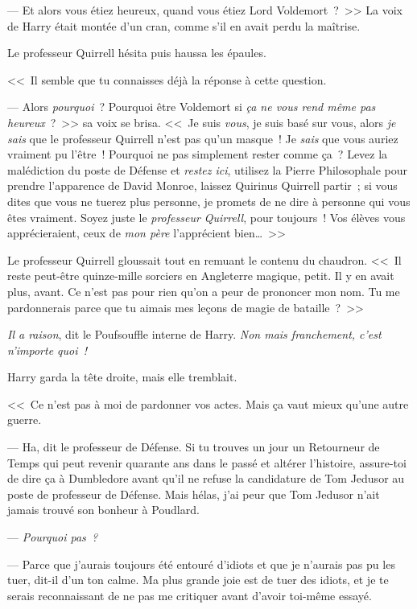 --- Et alors vous étiez heureux, quand vous étiez Lord Voldemort~?~>> La voix de Harry était montée d'un cran, comme s'il en avait perdu la maîtrise.

Le professeur Quirrell hésita puis haussa les épaules.

<<~Il semble que tu connaisses déjà la réponse à cette question.

--- Alors \emph{pourquoi}~? Pourquoi être Voldemort si \emph{ça ne vous rend même pas heureux}~?~>> sa voix se brisa. <<~Je suis \emph{vous}, je suis basé sur vous, alors \emph{je sais} que le professeur Quirrell n'est pas qu'un masque~! Je \emph{sais} que vous auriez vraiment pu l'être~! Pourquoi ne pas simplement rester comme ça~? Levez la malédiction du poste de Défense et \emph{restez ici}, utilisez la Pierre Philosophale pour prendre l'apparence de David Monroe, laissez Quirinus Quirrell partir~; si vous dites que vous ne tuerez plus personne, je promets de ne dire à personne qui vous êtes vraiment. Soyez juste le \emph{professeur Quirrell}, pour toujours~! Vos élèves vous apprécieraient, ceux de \emph{mon père} l'apprécient bien…~>>

Le professeur Quirrell gloussait tout en remuant le contenu du chaudron. <<~Il reste peut-être quinze-mille sorciers en Angleterre magique, petit. Il y en avait plus, avant. Ce n'est pas pour rien qu'on a peur de prononcer mon nom. Tu me pardonnerais parce que tu aimais mes leçons de magie de bataille~?~>>

\emph{Il a raison}, dit le Poufsouffle interne de Harry. \emph{Non mais franchement, c'est n'importe quoi~!}

Harry garda la tête droite, mais elle tremblait.

<<~Ce n'est pas à moi de pardonner vos actes. Mais ça vaut mieux qu'une autre guerre.

--- Ha, dit le professeur de Défense. Si tu trouves un jour un Retourneur de Temps qui peut revenir quarante ans dans le passé et altérer l'histoire, assure-toi de dire ça à Dumbledore avant qu'il ne refuse la candidature de Tom Jedusor au poste de professeur de Défense. Mais hélas, j'ai peur que Tom Jedusor n'ait jamais trouvé son bonheur à Poudlard.

--- \emph{Pourquoi pas~?}

--- Parce que j'aurais toujours été entouré d'idiots et que je n'aurais pas pu les tuer, dit-il d'un ton calme. Ma plus grande joie est de tuer des idiots, et je te serais reconnaissant de ne pas me critiquer avant d'avoir toi-même essayé.

